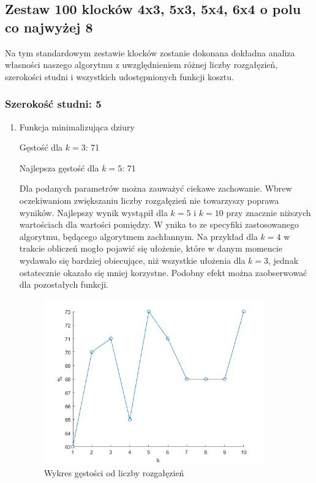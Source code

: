 \documentclass{article}
\begin{document}
\subsection{Zestaw 100 klocków 4x3, 5x3, 5x4, 6x4 o polu co najwyżej 8}
Na tym standardowym zestawie klocków zostanie dokonana dokładna analiza własności naszego algorytmu z uwzględnieniem różnej liczby rozgałęzień, szerokości studni i wszystkich udostępnionych funkcji kosztu.

\subsubsection{Szerokość studni: 5}
\begin{enumerate}
\item Funkcja minimalizująca dziury

Gęstość dla $k=3$: 71

Najlepsza gęstość dla $k=5$: 71

Dla podanych parametrów można zauważyć ciekawe zachowanie. 
Wbrew oczekiwaniom zwiększaniu liczby rozgałęzień nie towarzyszy poprawa wyników. 
Najlepszy wynik wystąpił dla $k=5$ i $k=10$ przy znacznie niższych wartościach dla wartości pomiędzy. W
ynika to ze specyfiki zastosowanego algorytmu, będącego algorytmem zachłannym. 
Na przykład dla $k=4$ w trakcie obliczeń mogło pojawić się ułożenie, które w danym momencie wydawało się bardziej obiecujące, niż wszystkie ułożenia dla $k=3$, jednak ostatecznie okazało się mniej korzystne.
Podobny efekt można zaobserwować dla pozostałych funkcji.

\begin{figure}[H]
\centering
\includegraphics[width=0.90\textwidth]{k_plot.png}
\caption{Wykres gęstości od liczby rozgałęzień}
\end{figure}


\end{enumerate}
\end{document}
